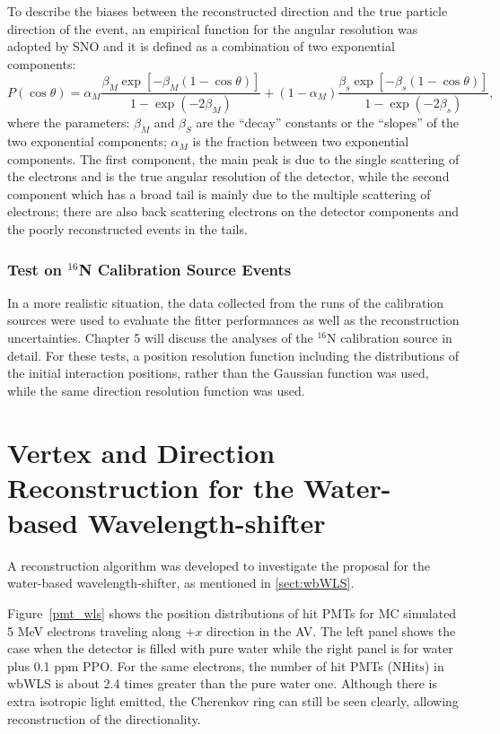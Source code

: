 To describe the biases between the reconstructed direction and the true particle direction of the event, an empirical function for the angular resolution was adopted by SNO\cite{boulay2004direct} and it is defined as a combination of two exponential components:
\begin{equation}
P(\cos\theta)=\alpha_M\frac{\beta_M\exp[-\beta_M(1-\cos\theta)]}{1-\exp(-2\beta_M)}+(1-\alpha_M)\frac{\beta_s\exp[-\beta_s(1-\cos\theta)]}{1-\exp(-2\beta_s)},
\end{equation}
where the parameters: $\beta_M$ and $\beta_S$ are the ``decay'' constants or the ``slopes'' of the two exponential components; $\alpha_M$ is the fraction between two exponential components. The first component, the main peak is due to the single scattering of the electrons and is the true angular resolution of the detector, while the second component which has a broad tail is mainly due to the multiple scattering of electrons; there are also back scattering electrons on the detector components and the poorly reconstructed events in the tails\cite{boulay2004direct}.


\subsubsection{Test on $^{16}$N Calibration Source Events}
In a more realistic situation, the data collected from the runs of the calibration sources were used to evaluate the fitter performances as well as the reconstruction uncertainties. Chapter 5 will discuss the analyses of the $^{16}$N calibration source in detail. For these tests, a position resolution function including the distributions of the initial interaction positions, rather than the Gaussian function was used, while the same direction resolution function was used. 

\section{Vertex and Direction Reconstruction for the Water-based Wavelength-shifter}\label{sect:WLSfitter}
A reconstruction algorithm was developed to investigate the proposal for the water-based wavelength-shifter, as mentioned in \ref{sect:wbWLS}.

Figure~\ref{pmt_wls} shows the position distributions of hit PMTs for MC simulated 5 MeV electrons traveling along $+x$ direction in the AV. The left panel shows the case when the detector is filled with pure water while the right panel is for water plus 0.1 ppm PPO. For the same electrons, the number of hit PMTs ($\mathrm{NHits}$) in wbWLS is about 2.4 times greater than the pure water one. Although there is extra isotropic light emitted, the Cherenkov ring can still be seen clearly, allowing reconstruction of the directionality.  

